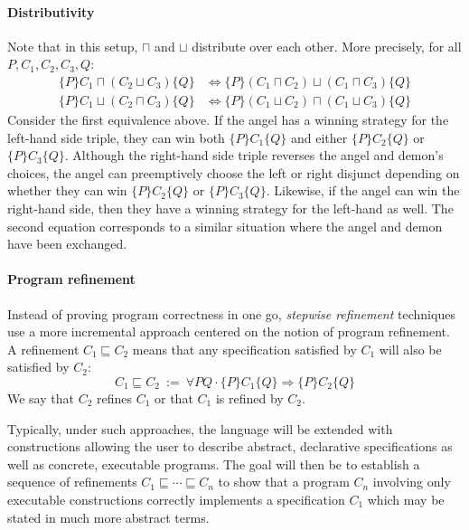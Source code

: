 \documentclass[format=sigplan,authordraft]{acmart}
\newcommand{\htr}[3]{{ \{{#1}\} {#2} \{{#3}\} }}
\begin{document}

\paragraph{Distributivity} %

Note that in this setup,
$\sqcap$ and $\sqcup$ distribute over each other.
More precisely, for all $P, C_1, C_2, C_3, Q$:
\begin{align*}
  \htr{P}{C_1 \sqcap (C_2 \sqcup C_3)}{Q} &\Leftrightarrow
    \htr{P}{(C_1 \sqcap C_2) \sqcup (C_1 \sqcap C_3)}{Q} \\
  \htr{P}{C_1 \sqcup (C_2 \sqcap C_3)}{Q} &\Leftrightarrow
    \htr{P}{(C_1 \sqcup C_2) \sqcap (C_1 \sqcup C_3)}{Q}
\end{align*}
Consider the first equivalence above.
If the angel has a winning strategy for
the left-hand side triple,
they can win both $\htr{P}{C_1}{Q}$
and either $\htr{P}{C_2}{Q}$ or $\htr{P}{C_3}{Q}$.
Although the right-hand side triple
reverses the angel and demon's choices,
the angel can preemptively choose the left or right
disjunct depending on whether they can win
$\htr{P}{C_2}{Q}$ or $\htr{P}{C_3}{Q}$.
Likewise, if the angel can win the right-hand side,
then they have a winning strategy for the left-hand as well.
The second equation corresponds to a similar situation
where the angel and demon have been exchanged.


\paragraph{Program refinement} %

Instead of proving program correctness in one go,
\emph{stepwise refinement} techniques use a more incremental approach
centered on the notion of program refinement.
A refinement $C_1 \sqsubseteq C_2$
means that any specification satisfied by $C_1$
will also be satisfied by $C_2$:
\[
    C_1 \sqsubseteq C_2 \: := \:
    \forall P Q \cdot
      \{P\} C_1 \{Q\} \Rightarrow
      \{P\} C_2 \{Q\}
\]
We say that $C_2$ refines $C_1$
or that $C_1$ is refined by $C_2$.

Typically,
under such approaches,
the language will be extended with constructions
allowing the user to describe
abstract, declarative specifications as well as
concrete, executable programs.
The goal will then be to establish
a sequence of refinements
$C_1 \sqsubseteq \cdots \sqsubseteq C_n$
to show that a program $C_n$ involving
only executable constructions
correctly implements a specification $C_1$
which may be stated in much more abstract terms.
\end{document}
